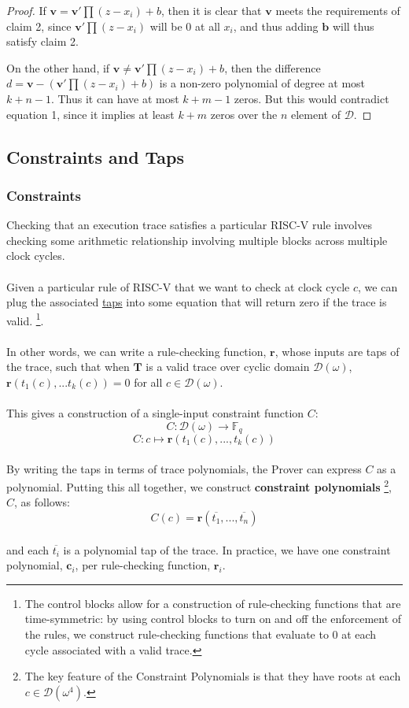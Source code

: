\documentclass[10pt,letterpaper,titlepage]{article}
\newcommand{\GF}[1]{\mathbb{F}_{#1}}
\newcommand{\w}[0]{\omega}
\newcommand{\D}[0]{\mathcal{D}}
\theoremstyle{definition}
\begin{document}
\begin{appendices}
\begin{proof}
  If $\mathbf{v} = \mathbf{v'} \prod (z - x_i) + b$, then it is clear that $\mathbf{v}$ meets the requirements of claim 2, since $\mathbf{v'} \prod (z - x_i)$ will be 0 at all $x_i$, and thus adding $\mathbf{b}$ will thus satisfy claim 2.

  On the other hand, if $\mathbf{v} \ne \mathbf{v'} \prod (z - x_i) + b$, then the difference $d = \mathbf{v} - (\mathbf{v'} \prod (z - x_i) + b)$ is a non-zero polynomial of degree at most $k + n - 1$.
  Thus it can have at most $k + m - 1$ zeros.
  But this would contradict equation 1, since it implies at least $k + m$ zeros over the $n$ element of $\D$.
\end{proof}

\subsection{Constraints and Taps}
\subsubsection{Constraints}
\label{constructing constraint polynomials}
Checking that an execution trace satisfies a particular RISC-V rule involves checking some arithmetic relationship involving multiple blocks across multiple clock cycles. \\
\\
Given a particular rule of RISC-V that we want to check at clock cycle $c$, we can plug the associated \hyperref[taps]{taps} into some equation that will return zero if the trace is valid.%
\footnote{The control blocks allow for a construction of rule-checking functions that are time-symmetric: by using control blocks to turn on and off the enforcement of the rules, we construct rule-checking functions that evaluate to 0 at each cycle associated with a valid trace.}. \\
\\
In other words, we can write a rule-checking function, $\mathbf{r}$, whose inputs are taps of the trace, such that when $\mathbf{T}$ is a valid trace over cyclic domain $\D(\w)$, $\mathbf{r}(t_1(c),...t_k(c))=0$ for all $c\in\D(\w)$. \\
\\
This gives a construction of a single-input constraint function $C$:
\[C:\D(\w)\to\GF{q}\]
\[C:c\mapsto \mathbf{r}(t_1(c),...,t_k(c))\]
\\
By writing the taps in terms of trace polynomials, the Prover can express $C$ as a polynomial.
Putting this all together, we construct \textbf{constraint polynomials}%
\footnote{The key feature of the Constraint Polynomials is that they have roots at each $c\in\D(\w^4)$.}, $C$, as follows:
\[C(c)=\mathbf{r}(\overline{t_1},...,\overline{t_n})\]
\\
and each $\overline{t_i}$ is a polynomial tap of the trace. In practice, we have one constraint polynomial, $\mathbf{c}_i$, per rule-checking function, $\mathbf{r}_i$.


\end{appendices}
\end{document}
